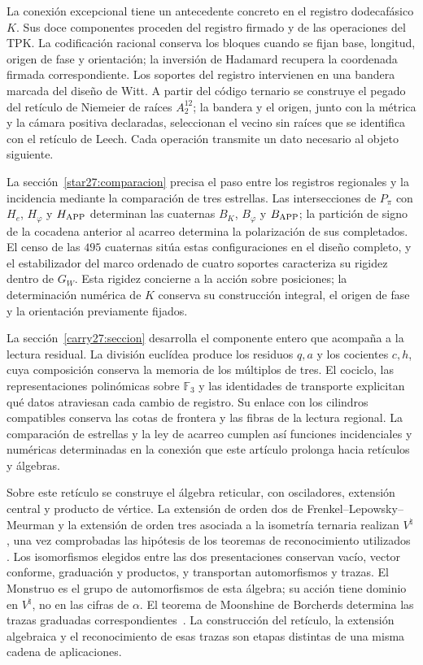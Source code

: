 La conexión excepcional tiene un antecedente concreto en el registro
dodecafásico \(K\). Sus doce componentes proceden del registro firmado
y de las operaciones del TPK. La codificación racional conserva los
bloques cuando se fijan base, longitud, origen de fase y orientación;
la inversión de Hadamard recupera la coordenada firmada correspondiente.
Los soportes del registro intervienen en una bandera marcada del diseño
de Witt. A partir del código ternario se construye el pegado del retículo
de Niemeier de raíces \(A_2^{12}\); la bandera y el origen, junto con la
métrica y la cámara positiva declaradas, seleccionan el vecino sin
raíces que se identifica con el retículo de Leech. Cada operación
transmite un dato necesario al objeto siguiente.

La sección~\ref{star27:comparacion} precisa el paso entre los registros
regionales y la incidencia mediante la comparación de tres estrellas.
Las intersecciones de \(P_\pi\) con \(H_e\), \(H_\varphi\) y
\(H_{\rm APP}\) determinan las cuaternas \(B_K\), \(B_\varphi\) y
\(B_{\rm APP}\); la partición de signo de la cocadena anterior al
acarreo determina la polarización de sus completados. El censo de
las \(495\) cuaternas sitúa estas configuraciones en el diseño completo,
y el estabilizador del marco ordenado de cuatro soportes caracteriza
su rigidez dentro de \(G_W\). Esta rigidez concierne a la acción sobre
posiciones; la determinación numérica de \(K\) conserva su construcción
integral, el origen de fase y la orientación previamente fijados.

La sección~\ref{carry27:seccion} desarrolla el componente entero que
acompaña a la lectura residual. La división euclídea produce los
residuos \(q,a\) y los cocientes \(c,h\), cuya composición conserva la
memoria de los múltiplos de tres. El cociclo, las representaciones
polinómicas sobre \(\mathbb F_3\) y las identidades de transporte
explicitan qué datos atraviesan cada cambio de registro. Su enlace con
los cilindros compatibles conserva las cotas de frontera y las fibras
de la lectura regional. La comparación de estrellas y la ley de
acarreo cumplen así funciones incidenciales y numéricas determinadas
en la conexión que este artículo prolonga hacia retículos y álgebras.



Sobre este retículo se construye el álgebra reticular, con osciladores,
extensión central y producto de vértice. La extensión de orden dos de
Frenkel--Lepowsky--Meurman y la extensión de orden tres asociada a la
isometría ternaria realizan \(V^\natural\), una vez comprobadas las
hipótesis de los teoremas de reconocimiento utilizados
\cite{flm,chenlamshimakura2016,abelamyamada2017}.
Los isomorfismos elegidos entre las dos presentaciones conservan vacío,
vector conforme, graduación y productos, y transportan automorfismos
y trazas. El Monstruo es el grupo de automorfismos de esta álgebra;
su acción tiene dominio en \(V^\natural\), no en las cifras de
\(\alpha\). El teorema de Moonshine de Borcherds determina las trazas
graduadas correspondientes~\cite{borcherds}. La construcción del
retículo, la extensión algebraica y el reconocimiento de esas trazas
son etapas distintas de una misma cadena de aplicaciones.

